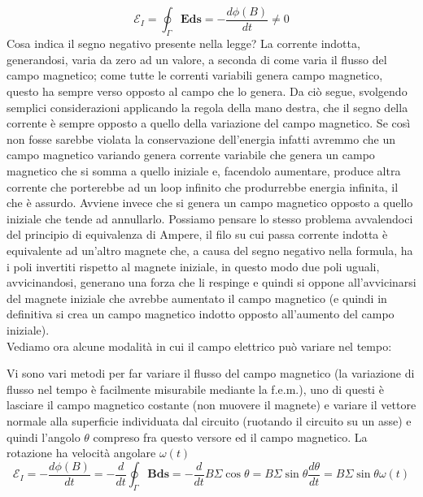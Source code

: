 \documentclass[
10pt, %
a4paper, %
oneside, %
headinclude,footinclude, %
BCOR5mm, %
]{scrartcl}
\begin{document}
\[\mathcal{E}_I = \oint_{\Gamma}\mathbf{E}\mathbf{ds}=-\frac{d\phi(B)}{dt}\neq 0\]
Cosa indica il segno negativo presente nella legge? La corrente indotta, generandosi, varia da zero ad un valore, a seconda di come varia il flusso del campo magnetico; come tutte le correnti variabili genera campo magnetico, questo ha sempre verso opposto al campo che lo genera. Da ciò segue, svolgendo semplici considerazioni applicando la regola della mano destra, che il segno della corrente è sempre opposto a quello della variazione del campo magnetico.  Se così non fosse sarebbe violata la conservazione dell'energia infatti avremmo che un campo magnetico variando genera corrente variabile che genera un campo magnetico che si somma a quello iniziale e, facendolo aumentare, produce altra corrente che porterebbe ad un loop infinito che produrrebbe energia infinita, il che è assurdo. Avviene invece che si genera un campo magnetico opposto a quello iniziale che tende ad annullarlo. Possiamo pensare lo stesso problema avvalendoci del principio di equivalenza di Ampere, il filo su cui passa corrente indotta è equivalente ad un'altro magnete che, a causa del segno negativo nella formula, ha i poli invertiti rispetto al magnete iniziale, in questo modo due poli uguali, avvicinandosi, generano una forza che li respinge e quindi si oppone all'avvicinarsi del magnete iniziale che avrebbe aumentato il campo magnetico  (e quindi in definitiva si crea un campo magnetico indotto opposto all'aumento del campo iniziale).\\
Vediamo ora alcune modalità in cui il campo elettrico può variare nel tempo:
\begin{esercizio}
Vi sono vari metodi per far variare il flusso del campo magnetico (la variazione di flusso nel tempo è facilmente misurabile mediante la f.e.m.), uno di questi è lasciare il campo magnetico costante (non muovere il magnete) e variare il vettore normale alla superficie individuata dal circuito (ruotando il circuito su un asse) e quindi l'angolo $\theta$ compreso fra questo versore ed il campo magnetico. La rotazione ha velocità angolare $\omega(t)$
\[\mathcal{E}_I = -\frac{d\phi (B)}{dt} = -\frac{d}{dt}\oint_{\Gamma}\mathbf{B}\mathbf{ds} = -\frac{d}{dt}B\Sigma \cos\theta=B\Sigma \sin\theta\frac{d\theta}{dt}=B\Sigma\sin\theta\omega(t)\]
\end{esercizio}
\end{document}
